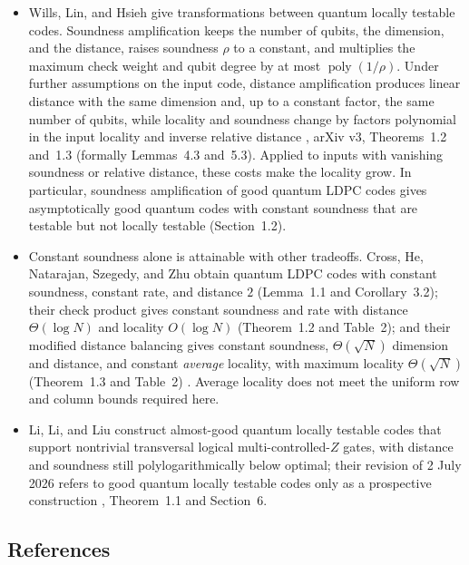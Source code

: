 \begin{itemize}
  \item Wills, Lin, and Hsieh give transformations between quantum locally
testable codes.  Soundness amplification keeps the number of qubits, the
dimension, and the distance, raises soundness $\rho$ to a constant, and
multiplies the maximum check weight and qubit degree by at most
$\operatorname{poly}(1/\rho)$.  Under further assumptions on the input code,
distance amplification produces linear distance with the same dimension and,
up to a constant factor, the same number of qubits, while locality and
soundness change by factors polynomial in the input locality and inverse
relative distance , arXiv v3, Theorems~1.2
and~1.3 (formally Lemmas~4.3 and~5.3).  Applied to inputs with vanishing
soundness or relative distance, these costs make the locality grow.  In
particular, soundness amplification of good quantum LDPC codes gives
asymptotically good quantum codes with constant soundness that are testable
but not locally testable (Section~1.2).

  \item Constant soundness alone is attainable with other tradeoffs.  Cross, He,
Natarajan, Szegedy, and Zhu obtain quantum LDPC codes with constant soundness,
constant rate, and distance $2$ (Lemma~1.1 and Corollary~3.2); their check
product gives constant soundness and rate with distance $\Theta(\log N)$ and
locality $O(\log N)$ (Theorem~1.2 and Table~2); and their modified distance
balancing gives constant soundness, $\Theta(\sqrt N)$ dimension and distance,
and constant \emph{average} locality, with maximum locality $\Theta(\sqrt N)$
(Theorem~1.3 and Table~2) .  Average
locality does not meet the uniform row and column bounds required here.

  \item Li, Li, and Liu construct almost-good quantum locally testable codes that
support nontrivial transversal logical multi-controlled-$Z$ gates, with
distance and soundness still polylogarithmically below optimal; their
revision of 2 July 2026 refers to good quantum locally testable codes only as
a prospective construction , Theorem~1.1 and
Section~6.
\end{itemize}

\subsection*{References}

